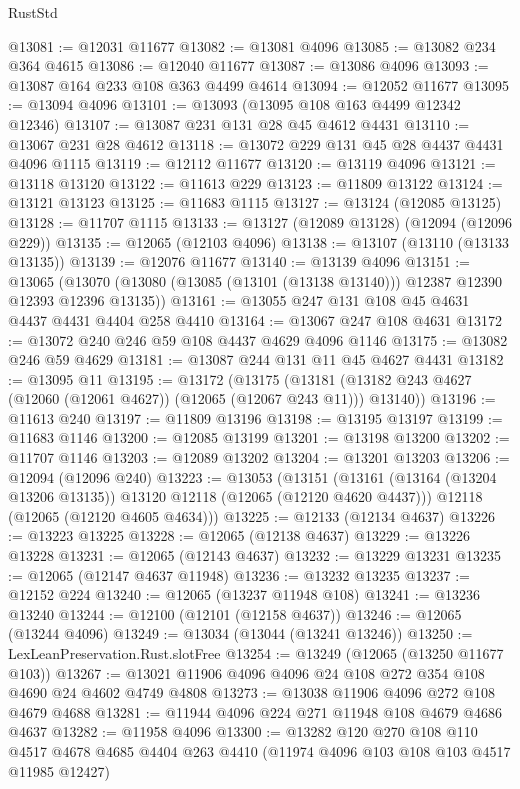 \begin{lexlean}{RustStd}
\begin{coremodule}
@13081 := @12031 @11677
@13082 := @13081 @4096
@13085 := @13082 @234 @364 @4615
@13086 := @12040 @11677
@13087 := @13086 @4096
@13093 := @13087 @164 @233 @108 @363 @4499 @4614
@13094 := @12052 @11677
@13095 := @13094 @4096
@13101 := @13093 (@13095 @108 @163 @4499 @12342 @12346)
@13107 := @13087 @231 @131 @28 @45 @4612 @4431
@13110 := @13067 @231 @28 @4612
@13118 := @13072 @229 @131 @45 @28 @4437 @4431 @4096 @1115
@13119 := @12112 @11677
@13120 := @13119 @4096
@13121 := @13118 @13120
@13122 := @11613 @229
@13123 := @11809 @13122
@13124 := @13121 @13123
@13125 := @11683 @1115
@13127 := @13124 (@12085 @13125)
@13128 := @11707 @1115
@13133 := @13127 (@12089 @13128) (@12094 (@12096 @229))
@13135 := @12065 (@12103 @4096)
@13138 := @13107 (@13110 (@13133 @13135))
@13139 := @12076 @11677
@13140 := @13139 @4096
@13151 := @13065
    (@13070 (@13080 (@13085 (@13101 (@13138 @13140))) @12387 @12390 @12393 @12396 @13135))
@13161 := @13055 @247 @131 @108 @45 @4631 @4437 @4431 @4404 @258 @4410
@13164 := @13067 @247 @108 @4631
@13172 := @13072 @240 @246 @59 @108 @4437 @4629 @4096 @1146
@13175 := @13082 @246 @59 @4629
@13181 := @13087 @244 @131 @11 @45 @4627 @4431
@13182 := @13095 @11
@13195 := @13172
    (@13175 (@13181 (@13182 @243 @4627 (@12060 (@12061 @4627)) (@12065 (@12067 @243 @11))) @13140))
@13196 := @11613 @240
@13197 := @11809 @13196
@13198 := @13195 @13197
@13199 := @11683 @1146
@13200 := @12085 @13199
@13201 := @13198 @13200
@13202 := @11707 @1146
@13203 := @12089 @13202
@13204 := @13201 @13203
@13206 := @12094 (@12096 @240)
@13223 := @13053
    (@13151
      (@13161 (@13164 (@13204 @13206 @13135)) @13120 @12118 (@12065 (@12120 @4620 @4437)))
      @12118
      (@12065 (@12120 @4605 @4634)))
@13225 := @12133 (@12134 @4637)
@13226 := @13223 @13225
@13228 := @12065 (@12138 @4637)
@13229 := @13226 @13228
@13231 := @12065 (@12143 @4637)
@13232 := @13229 @13231
@13235 := @12065 (@12147 @4637 @11948)
@13236 := @13232 @13235
@13237 := @12152 @224
@13240 := @12065 (@13237 @11948 @108)
@13241 := @13236 @13240
@13244 := @12100 (@12101 (@12158 @4637))
@13246 := @12065 (@13244 @4096)
@13249 := @13034 (@13044 (@13241 @13246))
@13250 := LexLeanPreservation.Rust.slotFree
@13254 := @13249 (@12065 (@13250 @11677 @103))
@13267 := @13021 @11906 @4096 @4096 @24 @108 @272 @354 @108 @4690 @24 @4602 @4749 @4808
@13273 := @13038 @11906 @4096 @272 @108 @4679 @4688
@13281 := @11944 @4096 @224 @271 @11948 @108 @4679 @4686 @4637
@13282 := @11958 @4096
@13300 := @13282
    @120
    @270
    @108
    @110
    @4517
    @4678
    @4685
    @4404
    @263
    @4410
    (@11974 @4096 @103 @108 @103 @4517 @11985 @12427)

\end{coremodule}
\end{lexlean}

